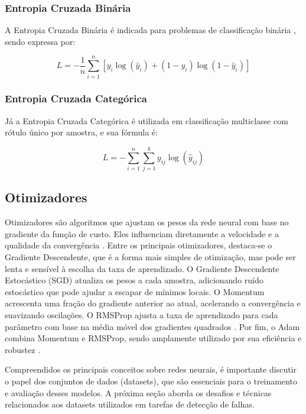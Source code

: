 \subsubsection{Entropia Cruzada Binária}

A Entropia Cruzada Binária é indicada para problemas de classificação binária \cite{zhang2018cross}, sendo expressa por:

\begin{equation}
    L = -\frac{1}{n} \sum_{i=1}^{n} \left[y_i \log(\hat{y}_i) + (1 - y_i) \log(1 - \hat{y}_i)\right]
    \label{eq:binary_crossentropy}
\end{equation}

\subsubsection{Entropia Cruzada Categórica}

Já a Entropia Cruzada Categórica é utilizada em classificação multiclasse com rótulo único por amostra, e sua fórmula é:

\begin{equation}
    L = -\sum_{i=1}^{n} \sum_{j=1}^{k} y_{ij} \log(\hat{y}_{ij})
    \label{eq:categorical_crossentropy}
\end{equation}

\subsection{Otimizadores}

Otimizadores são algoritmos que ajustam os pesos da rede neural com base no gradiente da função de custo. Eles influenciam diretamente a velocidade e a qualidade da convergência \cite{ruder2016overview}. Entre os principais otimizadores, destaca-se o Gradiente Descendente, que é a forma mais simples de otimização, mas pode ser lenta e sensível à escolha da taxa de aprendizado. O Gradiente Descendente Estocástico (SGD) atualiza os pesos a cada amostra, adicionando ruído estocástico que pode ajudar a escapar de mínimos locais. O Momentum acrescenta uma fração do gradiente anterior ao atual, acelerando a convergência e suavizando oscilações. O RMSProp ajusta a taxa de aprendizado para cada parâmetro com base na média móvel dos gradientes quadrados \cite{tieleman2012lecture}. Por fim, o Adam combina Momentum e RMSProp, sendo amplamente utilizado por sua eficiência e robustez \cite{kingma2014adam}.

Compreendidos os principais conceitos sobre redes neurais, é importante discutir o papel dos conjuntos de dados (datasets), que são essenciais para o treinamento e avaliação desses modelos. A próxima seção aborda os desafios e técnicas relacionados aos datasets utilizados em tarefas de detecção de falhas.

